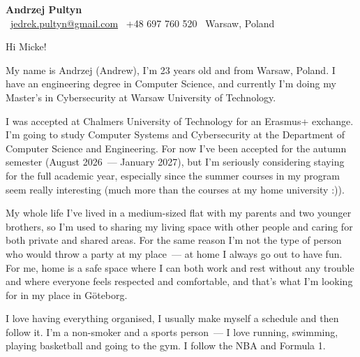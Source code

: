 \documentclass[11pt]{article}
\makeatletter
\newcommand{\myname}{Andrzej Pultyn}
\newcommand{\myemail}{jedrek.pultyn@gmail.com}
\newcommand{\myphone}{+48 697 760 520}        %
\newcommand{\mylocation}{Warsaw, Poland}
\makeatother
\begin{document}
\begin{tcolorbox}[
    colback=lightgray,
    colframe=lightgray,
    boxrule=0pt,
    arc=4pt,
    left=14pt, right=14pt, top=12pt, bottom=12pt
]
{\Huge\bfseries\color{accent}\myname}\\[6pt]
{\small
    \faEnvelope[regular]~\href{mailto:\myemail}{\myemail} \quad
    \faPhone*~\myphone \quad
    \faMapMarker*~\mylocation \quad
}
\end{tcolorbox}

\vspace{0.8em}

\noindent Hi Micke!
\vspace{0.6em}

My name is Andrzej (Andrew), I'm 23 years old and from Warsaw, Poland. I have
an engineering degree in Computer Science, and currently I'm doing my Master's
in Cybersecurity at Warsaw University of Technology.

I was accepted at Chalmers University of Technology for an Erasmus+ exchange.
I'm going to study Computer Systems and Cybersecurity at the Department of
Computer Science and Engineering. For now I've been accepted for the autumn
semester (August 2026~--- January 2027), but I'm seriously considering staying
for the full academic year, especially since the summer courses in my program
seem really interesting (much more than the courses at my home university :)).

My whole life I've lived in a medium-sized flat with my parents and two younger
brothers, so I'm used to sharing my living space with other people and caring
for both private and shared areas. For the same reason I'm not the type of
person who would throw a party at my place~--- at home I always go out to have
fun. For me, home is a safe space where I can both work and rest without any
trouble and where everyone feels respected and comfortable, and that's what
I'm looking for in my place in Göteborg.

I love having everything organised, I usually make myself a schedule and then
follow it. I'm a non-smoker and a sports person~--- I love running, swimming,
playing basketball and going to the gym. I follow the NBA and Formula 1.
\end{document}

